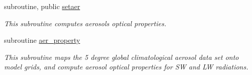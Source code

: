 {\bf }\par
\begin{DoxyCompactItemize}
\item 
subroutine, public \hyperlink{namespacemodule__radiation__aerosols_a94a9a162f822d2ee5c5bff611403dd06}{setaer}                                                                                               
\begin{DoxyCompactList}\small\item\em This subroutine computes aerosols optical properties. \end{DoxyCompactList}\end{DoxyCompactItemize}

{\bf }\par
\begin{DoxyCompactItemize}
\item 
subroutine \hyperlink{namespacemodule__radiation__aerosols_a0c8525abbb12f5f03e3c136c851c11bd}{aer\+\_\+property}                                                                                   
\begin{DoxyCompactList}\small\item\em This subroutine maps the 5 degree global climatological aerosol data set onto model grids, and compute aerosol optical properties for SW and LW radiations. \end{DoxyCompactList}\end{DoxyCompactItemize}

